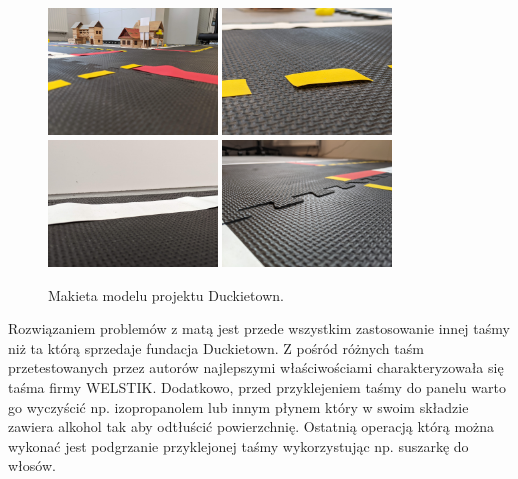 \documentclass{svproc}
\begin{document}
\begin{figure}[ht!]
    \centering
    \includegraphics[width=0.4\textwidth]{floor-1.jpg}
    \includegraphics[width=0.4\textwidth]{floor-2.jpg}
    \\
    \includegraphics[width=0.4\textwidth]{floor-3.jpg}
    \includegraphics[width=0.4\textwidth]{floor-4.jpg}
    \caption{Makieta modelu projektu Duckietown.}
    \label{fig:smart-city-plan-1}
\end{figure}

Rozwiązaniem problemów z matą jest przede wszystkim zastosowanie innej taśmy niż ta którą sprzedaje fundacja Duckietown. Z pośród różnych taśm przetestowanych przez autorów najlepszymi właściwościami charakteryzowała się taśma firmy WELSTIK. Dodatkowo, przed przyklejeniem taśmy do panelu warto go wyczyścić np. izopropanolem lub innym płynem który w swoim składzie zawiera alkohol tak aby odtłuścić powierzchnię. Ostatnią operacją którą można wykonać jest podgrzanie przyklejonej taśmy wykorzystując np. suszarkę do włosów. 
\end{document}
